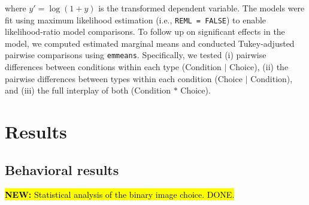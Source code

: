 \documentclass[a4paper, ruler]{CUP-JNL-LIN}%
\begin{document}
where $y' = \log(1+y)$ is the transformed dependent variable. The models were fit using maximum likelihood estimation (i.e., \texttt{REML = FALSE}) to enable likelihood-ratio model comparisons. To follow up on significant effects in the model, we computed estimated marginal means and conducted Tukey-adjusted pairwise comparisons using \texttt{emmeans}. Specifically, we tested (i) pairwise differences between conditions within each type (Condition $\mid$ Choice), (ii) the pairwise differences between types within each condition (Choice $\mid$ Condition), and (iii) the full interplay of both (Condition $\ast$ Choice).



\section{Results}


\subsection{Behavioral results}

\hl{\textbf{NEW:} Statistical analysis of the binary image choice. DONE.}


\end{document}
